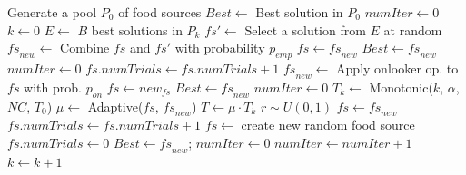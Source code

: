\documentclass[icae]{iosart2x}
\newcommand{\reviewed}[1]{#1} %
\begin{document}
\begin{algorithm*}[htb]
\small
\caption{\label{algABC} Pseudocode of the Elitist Seasonal ABC }
\begin{center}
\begin{algorithmic}
	\State Generate a pool $P_0$ of food sources
	\State $Best \leftarrow $ Best solution in $P_0$
	\State $\mathit{numIter} \leftarrow 0$
	\State $k \leftarrow 0$
		\State {}	
			\State $E \leftarrow$ $B$ best solutions in $P_k$
	        	\State $\mathit{fs}' \leftarrow$ Select a solution from $E$ at random
	       		\State ${\mathit{fs}_{new} \leftarrow}$ Combine $\mathit{fs}$ and $\mathit{fs}'$ with probability $p_{emp}$
    				\State $\mathit{fs}  \leftarrow \mathit{fs}_{new}$
    					\State ${Best}  \leftarrow {\mathit{fs}_{new}}$
    					\State $numIter \leftarrow 0$
    				\EndIf
				\Else
					\State $\mathit{fs.numTrials}  \leftarrow \mathit{fs.numTrials} +1$
				\EndIf
			\EndFor
		\State {}	
	       			\State ${\mathit{fs}_{new} \leftarrow}$ Apply onlooker op. to $\mathit{fs}$ with prob. $p_{on}$
    						\State ${fs}  \leftarrow {new_{fs}}$
    						\State ${Best}  \leftarrow \mathit{fs}_{new}$
	    					\State $numIter \leftarrow 0$
    					 \EndIf
					\Else
                        \State \reviewed{$T_k \leftarrow$ Monotonic($k$, $\alpha$, $NC$, $T_0$)} \Comment{\reviewed{see Section~\ref{subsec:monotonic}}}
						\State $\mu \leftarrow$ Adaptive($\mathit{fs}$, $\mathit{fs}_{new}$) \Comment{\reviewed{see Section~\ref{subsec:adaptive}}}
						\State $T \leftarrow \mu \cdot T_k$
						\State $r \sim U(0,1) $
							\State ${fs}  \leftarrow \mathit{fs}_{new}$
						\Else
							\State $\mathit{fs.numTrials}  \leftarrow \mathit{fs.numTrials} +1$
						\EndIf	
					\EndIf
				\EndIf
			\EndFor	
		\State {}	
					\State $\mathit{fs}  \leftarrow $ create new random food source
					\State $\mathit{fs.numTrials} \leftarrow 0$
    					\State ${Best}  \leftarrow \mathit{fs}_{new}$;
    					\State $numIter \leftarrow 0$
    				 \EndIf
				\EndIf
			\EndFor	
		\State $numIter \leftarrow numIter+1$
		\State $k \leftarrow k + 1$
	\EndWhile
\end{algorithmic}
\end{center}
\end{algorithm*}
\end{document}
